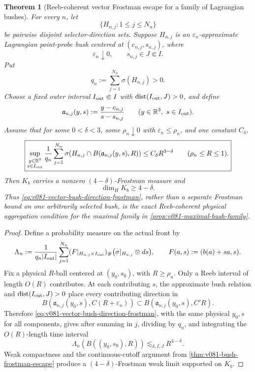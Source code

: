 \documentclass[10pt]{article}
\newtheorem{theorem}{Theorem}[section]
\newcommand{\dist}{\operatorname{dist}}
\begin{document}
\begin{theorem}[Reeb-coherent vector Frostman escape for a family of Lagrangian bushes]
\label{thm:v081-bush-family-frostman-escape}
For every \(n\), let
\[
\{H_{n,j}:1\le j\le N_n\}
\]
be pairwise disjoint selector-direction sets.  Suppose \(H_{n,j}\) is an
\(\varepsilon_n\)-approximate Lagrangian point-probe bush centered at
\((c_{n,j},s_{n,j})\), where
\[
\varepsilon_n\downarrow0,
\qquad
s_{n,j}\in J\Subset I.
\]
Put
\[
q_n:=\sum_{j=1}^{N_n}\sigma(H_{n,j})>0.
\]
Choose a fixed outer interval \(I_{\rm out}\Subset I\) with
\(\dist(I_{\rm out},J)>0\), and define
\[
\mathfrak a_{n,j}(y,s)
:=
\frac{y-c_{n,j}}{s-s_{n,j}}
\qquad
(y\in\mathbb R^3,\ s\in I_{\rm out}).
\]
Assume that for some \(0<\delta<3\), some
\(\rho_n\downarrow0\) with \(\varepsilon_n\le\rho_n\), and one constant \(C_\delta\),
\begin{equation}
\label{eq:v081-vector-bush-direction-frostman}
\boxed{
\sup_{\substack{y\in\mathbb R^3\\ s\in I_{\rm out}}}
\frac1{q_n}
\sum_{j=1}^{N_n}
\sigma\!\left(
H_{n,j}\cap B(\mathfrak a_{n,j}(y,s),R)
\right)
\le
C_\delta R^{3-\delta}
\qquad
(\rho_n\le R\le1).
}
\end{equation}
Then \(K_b\) carries a nonzero
\((4-\delta)\)-Frostman measure and
\[
\dim_HK_b\ge4-\delta.
\]
Thus \eqref{eq:v081-vector-bush-direction-frostman}, rather than a separate Frostman bound on one
arbitrarily selected bush, is the exact Reeb-coherent physical aggregation condition for the maximal family in
\cref{prop:v081-maximal-bush-family}.
\end{theorem}

\begin{proof}
Define a probability measure on the actual front by
\[
\Lambda_n
:=
\frac1{q_n|I_{\rm out}|}
\sum_{j=1}^{N_n}
(F|_{H_{n,j}\times I_{\rm out}})_\#
\bigl(\sigma|_{H_{n,j}}\otimes ds\bigr),
\qquad
F(a,s):=(b(a)+sa,s).
\]
Fix a physical \(R\)-ball centered at \((y_0,s_0)\), with \(R\ge\rho_n\).  Only a Reeb interval
of length \(O(R)\) contributes.  At each contributing \(s\), the approximate bush relation and
\(\dist(I_{\rm out},J)>0\) place every contributing direction in
\[
B\!\left(\mathfrak a_{n,j}(y_0,s),C(R+\varepsilon_n)\right)
\subset
B\!\left(\mathfrak a_{n,j}(y_0,s),C'R\right).
\]
Therefore \eqref{eq:v081-vector-bush-direction-frostman}, with the same physical \(y_0,s\) for
all components, gives after summing in \(j\), dividing by \(q_n\), and integrating the
\(O(R)\)-length time interval
\[
\Lambda_n(B((y_0,s_0),R))
\lesssim_{\delta,I,J}
R^{4-\delta}.
\]
Weak compactness and the continuous-cutoff argument from
\cref{thm:v081-bush-frostman-escape} produce a
\((4-\delta)\)-Frostman weak limit supported on \(K_b\).
\end{proof}
\end{document}
